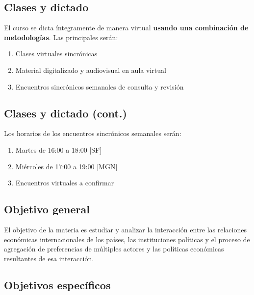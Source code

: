 \documentclass[
]{article}
\providecommand{\tightlist}{%
  \setlength{\itemsep}{0pt}\setlength{\parskip}{0pt}}
\begin{document}
\hypertarget{clases-y-dictado}{%
\subsection{Clases y dictado}\label{clases-y-dictado}}

El curso se dicta íntegramente de manera virtual \textbf{usando una
combinación de metodologías}. Las principales serán:

\begin{enumerate}
\def\labelenumi{\arabic{enumi}.}
\tightlist
\item
  Clases virtuales sincrónicas
\item
  Material digitalizado y audiovisual en aula virtual
\item
  Encuentros sincrónicos semanales de consulta y revisión
\end{enumerate}

\hypertarget{clases-y-dictado-cont.}{%
\subsection{Clases y dictado (cont.)}\label{clases-y-dictado-cont.}}

Los horarios de los encuentros sincrónicos semanales serán:

\begin{enumerate}
\def\labelenumi{\arabic{enumi}.}
\tightlist
\item
  Martes de 16:00 a 18:00 {[}SF{]}
\item
  Miércoles de 17:00 a 19:00 {[}MGN{]}
\item
  Encuentros virtuales a confirmar
\end{enumerate}

\hypertarget{objetivo-general}{%
\subsection{Objetivo general}\label{objetivo-general}}

El objetivo de la materia es estudiar y analizar la interacción entre
las relaciones económicas internacionales de los países, las
instituciones políticas y el proceso de agregación de preferencias de
múltiples actores y las políticas económicas resultantes de esa
interacción.

\hypertarget{objetivos-especuxedficos}{%
\subsection{Objetivos específicos}\label{objetivos-especuxedficos}}
\end{document}
